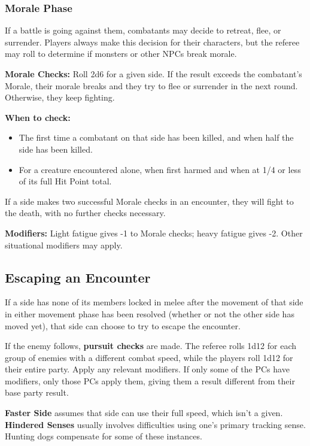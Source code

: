 \documentclass{book}
\providecommand{\tightlist}{%
\setlength{\itemsep}{0pt}\setlength{\parskip}{0pt}}
\begin{document}
\subsubsection*{Morale Phase}\label{morale-phase}

If a battle is going against them, combatants may decide to retreat,
flee, or surrender. Players always make this decision for their
characters, but the referee may roll to determine if monsters or other
NPCs break morale.

\textbf{Morale Checks:} Roll 2d6 for a given side. If the result exceeds
the combatant's Morale, their morale breaks and they try to flee or
surrender in the next round. Otherwise, they keep fighting.

\textbf{When to check:}

\begin{itemize}
\tightlist
\item
  The first time a combatant on that side has been killed, and when half
  the side has been killed.
\item
  For a creature encountered alone, when first harmed and when at 1/4 or
  less of its full Hit Point total.
\end{itemize}

If a side makes two successful Morale checks in an encounter, they will
fight to the death, with no further checks necessary.

\textbf{Modifiers:} Light fatigue gives -1 to Morale checks; heavy
fatigue gives -2. Other situational modifiers may apply.

\subsection*{Escaping an Encounter}\label{escaping-an-encounter}

If a side has none of its members locked in melee after the movement of
that side in either movement phase has been resolved (whether or not the
other side has moved yet), that side can choose to try to escape the
encounter.

If the enemy follows, \textbf{pursuit checks} are made. The referee
rolls 1d12 for each group of enemies with a different combat speed,
while the players roll 1d12 for their entire party. Apply any relevant
modifiers. If only some of the PCs have modifiers, only those PCs apply
them, giving them a result different from their base party result.




\textbf{Faster Side} assumes that side can use their full speed, which
isn't a given. \textbf{Hindered Senses} usually involves difficulties
using one's primary tracking sense. Hunting dogs compensate for some of
these instances.
\end{document}
